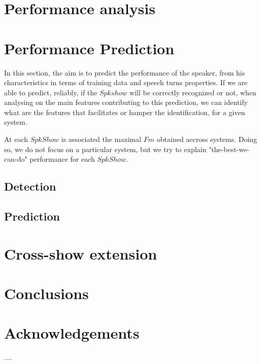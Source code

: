 \documentclass[a4paper]{article}
\begin{document}
\section{Performance analysis}


\section{Performance Prediction}

In this section, the aim is to predict the performance of the speaker, from his characteristics in terms of training data and speech turns properties. If we are able to predict, reliably, if the $Spkshow$ will be correctly recognized or not, when analysing on the main features contributing to this prediction, we can identify what are the features that  facilitates or hamper the identification, for a given system.

At each $SpkShow$ is associated the maximal $Fm$ obtained accross systems. Doing so, we do not focus on a particular system, but we try to explain "the-best-we-can-do" performance for each $SpkShow$.

\subsection{Detection}


\subsection{Prediction}

\section{Cross-show extension}





\section{Conclusions}



\section{Acknowledgements}


\newpage

\eightpt


\begin{thebibliography}{10}

 ....

\end{thebibliography}
\end{document}
